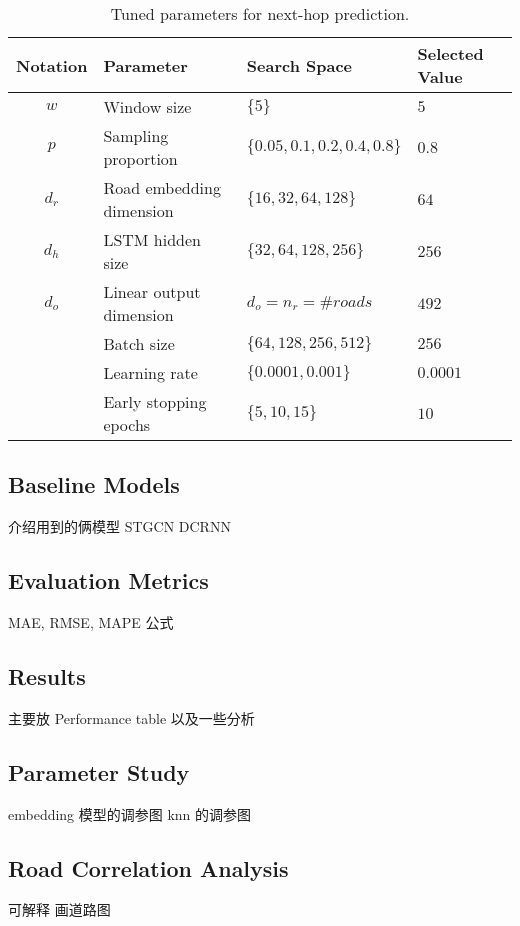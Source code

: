 \begin{table}[htb]
    \begin{center}
        \caption{Tuned parameters for next-hop prediction.}
        \label{next-hop_params}
        \begin{tabular}{clll}
            \toprule
  
            \textbf{Notation} & \textbf{Parameter} & \textbf{Search Space} & \textbf{Selected Value}\\
  
            \midrule
  
            $w$ & Window size & $\{5 \}$ & $5$\\
            $p$ & Sampling proportion & $\{0.05, 0.1, 0.2, 0.4, 0.8\}$ & $0.8$\\
            $d_r$ & Road embedding dimension & $\{16, 32, 64, 128 \}$ & $64$\\
            $d_h$ & LSTM hidden size & $\{32, 64, 128, 256 \}$ & $256$\\
            $d_o$ & Linear output dimension & $d_o=n_r=\#roads$ & $492$\\
            ~ & Batch size & $\{64, 128, 256, 512 \}$ & $256$\\
            ~ & Learning rate & $\{0.0001, 0.001\}$ & $0.0001$\\
            ~ & Early stopping epochs & $\{5, 10, 15\}$ & $10$\\
  
            \bottomrule
        \end{tabular}
    \end{center}
\end{table}

\subsection{Baseline Models}
介绍用到的俩模型 STGCN DCRNN

\subsection{Evaluation Metrics}
MAE, RMSE, MAPE 公式

\subsection{Results}
主要放 Performance table
以及一些分析

\subsection{Parameter Study}
embedding 模型的调参图
knn 的调参图

\subsection{Road Correlation Analysis}
可解释
画道路图
